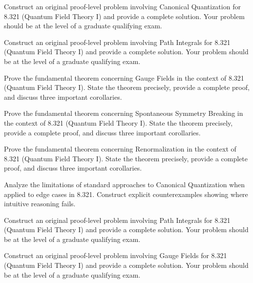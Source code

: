\documentclass[12pt,a4paper]{exam}
\begin{document}
\begin{questions}

\question[4]
Construct an original proof-level problem involving Canonical Quantization for 8.321 (Quantum Field Theory I) and provide a complete solution. Your problem should be at the level of a graduate qualifying exam.

\vspace{0.3cm}

\question[5]
Construct an original proof-level problem involving Path Integrals for 8.321 (Quantum Field Theory I) and provide a complete solution. Your problem should be at the level of a graduate qualifying exam.

\vspace{0.3cm}

\question[5]
Prove the fundamental theorem concerning Gauge Fields in the context of 8.321 (Quantum Field Theory I). State the theorem precisely, provide a complete proof, and discuss three important corollaries.

\vspace{0.3cm}

\question[4]
Prove the fundamental theorem concerning Spontaneous Symmetry Breaking in the context of 8.321 (Quantum Field Theory I). State the theorem precisely, provide a complete proof, and discuss three important corollaries.

\vspace{0.3cm}

\question[4]
Prove the fundamental theorem concerning Renormalization in the context of 8.321 (Quantum Field Theory I). State the theorem precisely, provide a complete proof, and discuss three important corollaries.

\vspace{0.3cm}

\question[6]
Analyze the limitations of standard approaches to Canonical Quantization when applied to edge cases in 8.321. Construct explicit counterexamples showing where intuitive reasoning fails.

\vspace{0.3cm}

\question[5]
Construct an original proof-level problem involving Path Integrals for 8.321 (Quantum Field Theory I) and provide a complete solution. Your problem should be at the level of a graduate qualifying exam.

\vspace{0.3cm}

\question[2]
Construct an original proof-level problem involving Gauge Fields for 8.321 (Quantum Field Theory I) and provide a complete solution. Your problem should be at the level of a graduate qualifying exam.


\end{questions}
\end{document}
